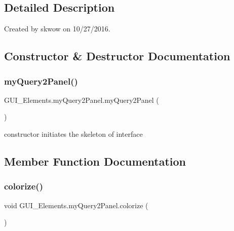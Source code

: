 \subsection{Detailed Description}
Created by skwow on 10/27/2016. 

\subsection{Constructor \& Destructor Documentation}
\hypertarget{class_g_u_i___elements_1_1my_query2_panel_ac3fc56f3c07e6c0bc190e6e5f4b3a73b}{}\label{class_g_u_i___elements_1_1my_query2_panel_ac3fc56f3c07e6c0bc190e6e5f4b3a73b} 
\subsubsection{\texorpdfstring{my\+Query2\+Panel()}{myQuery2Panel()}}
{\footnotesize\ttfamily G\+U\+I\+\_\+\+Elements.\+my\+Query2\+Panel.\+my\+Query2\+Panel (\begin{DoxyParamCaption}{ }\end{DoxyParamCaption})}



constructor initiates the skeleton of interface 



\subsection{Member Function Documentation}
\hypertarget{class_g_u_i___elements_1_1my_query2_panel_a047854ba4d510a94711c82daa2ca81bb}{}\label{class_g_u_i___elements_1_1my_query2_panel_a047854ba4d510a94711c82daa2ca81bb} 
\subsubsection{\texorpdfstring{colorize()}{colorize()}}
{\footnotesize\ttfamily void G\+U\+I\+\_\+\+Elements.\+my\+Query2\+Panel.\+colorize (\begin{DoxyParamCaption}{ }\end{DoxyParamCaption})}

